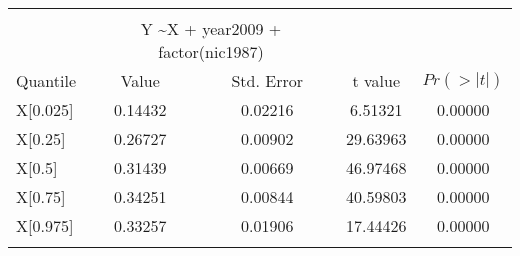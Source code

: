 \begin{tabular}{@{\extracolsep{5pt}}lcccc} 
\\[-1.8ex]\hline 
 \cline{2-5} 
 \\[-1.8ex] & \multicolumn{2}{4}{Y \textasciitilde X + year2009 + factor(nic1987)}  \\ \hline
Quantile & Value &   Std. Error & t value  & $Pr(>|t|)$  \\
\hline 
X[0.025]  &    0.14432  &  0.02216 &   6.51321 &  0.00000 \\
X[0.25]   &    0.26727  &  0.00902 &  29.63963 &  0.00000 \\
X[0.5]    &    0.31439  &  0.00669 &  46.97468 &  0.00000 \\ 
X[0.75]   &    0.34251  &  0.00844 &  40.59803 &  0.00000 \\
X[0.975]  &    0.33257  &  0.01906 &  17.44426 &  0.00000 \\
\hline 
\hline \\[-1.8ex] 
\end{tabular}